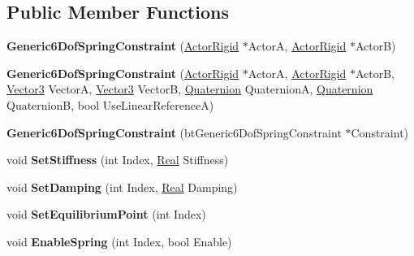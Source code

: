 \subsection*{Public Member Functions}
\begin{DoxyCompactItemize}
\item 
\hypertarget{classphys_1_1Generic6DofSpringConstraint_a88cf5bfb5db55b957652831c3295b56a}{
{\bfseries Generic6DofSpringConstraint} (\hyperlink{classphys_1_1ActorRigid}{ActorRigid} $\ast$ActorA, \hyperlink{classphys_1_1ActorRigid}{ActorRigid} $\ast$ActorB)}
\label{d1/dc7/classphys_1_1Generic6DofSpringConstraint_a88cf5bfb5db55b957652831c3295b56a}

\item 
\hypertarget{classphys_1_1Generic6DofSpringConstraint_afedaa8d86366f831bbde91e0825ae632}{
{\bfseries Generic6DofSpringConstraint} (\hyperlink{classphys_1_1ActorRigid}{ActorRigid} $\ast$ActorA, \hyperlink{classphys_1_1ActorRigid}{ActorRigid} $\ast$ActorB, \hyperlink{classphys_1_1Vector3}{Vector3} VectorA, \hyperlink{classphys_1_1Vector3}{Vector3} VectorB, \hyperlink{classphys_1_1Quaternion}{Quaternion} QuaternionA, \hyperlink{classphys_1_1Quaternion}{Quaternion} QuaternionB, bool UseLinearReferenceA)}
\label{d1/dc7/classphys_1_1Generic6DofSpringConstraint_afedaa8d86366f831bbde91e0825ae632}

\item 
\hypertarget{classphys_1_1Generic6DofSpringConstraint_aecd43f6209799587aacee584d3840491}{
{\bfseries Generic6DofSpringConstraint} (btGeneric6DofSpringConstraint $\ast$Constraint)}
\label{d1/dc7/classphys_1_1Generic6DofSpringConstraint_aecd43f6209799587aacee584d3840491}

\item 
\hypertarget{classphys_1_1Generic6DofSpringConstraint_a44b8d8d1616251d09dfe61ecc2f84a02}{
void {\bfseries SetStiffness} (int Index, \hyperlink{namespacephys_af7eb897198d265b8e868f45240230d5f}{Real} Stiffness)}
\label{d1/dc7/classphys_1_1Generic6DofSpringConstraint_a44b8d8d1616251d09dfe61ecc2f84a02}

\item 
\hypertarget{classphys_1_1Generic6DofSpringConstraint_a045ada78452b640730d93b1a55a07ed0}{
void {\bfseries SetDamping} (int Index, \hyperlink{namespacephys_af7eb897198d265b8e868f45240230d5f}{Real} Damping)}
\label{d1/dc7/classphys_1_1Generic6DofSpringConstraint_a045ada78452b640730d93b1a55a07ed0}

\item 
\hypertarget{classphys_1_1Generic6DofSpringConstraint_a2a7fac22f3e47671c66bfd0fea085544}{
void {\bfseries SetEquilibriumPoint} (int Index)}
\label{d1/dc7/classphys_1_1Generic6DofSpringConstraint_a2a7fac22f3e47671c66bfd0fea085544}

\item 
\hypertarget{classphys_1_1Generic6DofSpringConstraint_ad25cb82744be6045c53d41fe6fb33051}{
void {\bfseries EnableSpring} (int Index, bool Enable)}
\label{d1/dc7/classphys_1_1Generic6DofSpringConstraint_ad25cb82744be6045c53d41fe6fb33051}

\end{DoxyCompactItemize}

